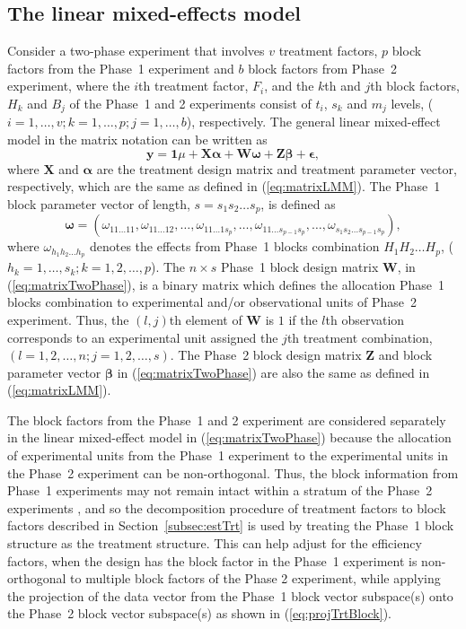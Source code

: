 \documentclass[article]{jss}
\newcommand{\Z}{\mathbf{Z}}
\newcommand{\X}{\mathbf{X}}
\newcommand{\W}{\mathbf{W}}
\begin{document}
\subsection{The linear mixed-effects model}
\label{subsec:phase2Model}
Consider a two-phase experiment that involves $v$ treatment factors, $p$ block factors from the Phase~1 experiment and $b$ block factors from Phase~2 experiment, where the $i$th treatment factor, $F_i$, and the $k$th and $j$th block factors, $H_k$ and $B_j$ of the Phase~1 and 2 experiments consist of $t_i$, $s_k$ and $m_j$ levels, ($i = 1,\dots,v; k = 1,\dots,p; j = 1,\dots,b$), respectively. The general linear mixed-effect model in the matrix notation can be written as
\begin{equation}
\label{eq:matrixTwoPhase}
\bm{y} = \bm{1}\mu + \X\bm{\alpha} + \W\bm{\omega} + \Z\bm{\beta} + \bm{\epsilon},
\end{equation}
where $\X$ and $\bm{\alpha}$ are the treatment design matrix and treatment parameter vector, respectively, which are the same as defined in (\ref{eq:matrixLMM}). The Phase~1 block parameter vector of length, $s = s_1 s_2 \dots s_p$, is defined as 
\begin{equation}
\label{eq:phase1BlockPar}
\bm{\omega} = (\omega_{11 \dots 11}, \omega_{11 \dots 12}, \dots,  \omega_{1 1 \dots 1s_p},\dots,\omega_{1 1 \dots s_{p-1}s_p},\dots,\omega_{s_1 s_2 \dots s_{p-1}s_p}),
\end{equation}
where $\omega_{h_1 h_2 \dots h_p}$ denotes the effects from Phase~1 blocks combination $H_1 H_2 \dots H_p$, ($h_k = 1, \dots, s_k; k = 1,2, \dots, p$). The $n \times s$ Phase~1 block design matrix $\W$, in (\ref{eq:matrixTwoPhase}), is a binary matrix which defines the allocation Phase~1 blocks combination to experimental and/or observational units of Phase~2 experiment. Thus, the $(l,j)$th element of $\W$ is $1$ if the $l$th observation corresponds to an experimental unit assigned the $j$th treatment combination, $(l=1,2,\dots,n; j=1,2,\dots, s)$. The Phase~2 block design matrix $\Z$ and block parameter vector $\bm{\beta}$ in (\ref{eq:matrixTwoPhase}) are also the same as defined in (\ref{eq:matrixLMM}).

The block factors from the Phase~1 and 2 experiment are considered separately in the linear mixed-effect model in (\ref{eq:matrixTwoPhase}) because the allocation of experimental units from the Phase~1 experiment to the experimental units in the Phase~2 experiment can be non-orthogonal. Thus, the block information from Phase~1 experiments may not remain intact within a stratum of the Phase~2 experiments \citep{Wood1988}, and so the decomposition procedure of treatment factors to block factors described in Section~\ref{subsec:estTrt} is used by treating the Phase~1 block structure as the treatment structure. This can help adjust for the efficiency factors, when the design has the block factor in the Phase~1 experiment is non-orthogonal to multiple block factors of the Phase 2 experiment, while applying the projection of the data vector from the Phase~1 block vector subspace(s) onto the Phase~2 block vector subspace(s) as shown in (\ref{eq:projTrtBlock}). 
\end{document}
